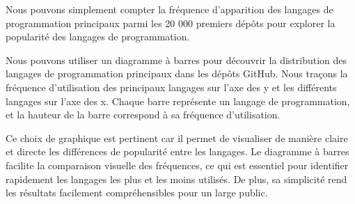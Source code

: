 \documentclass[
]{article}
\newenvironment{Shaded}{\begin{snugshade}}{\end{snugshade}}
\newcommand{\AttributeTok}[1]{\textcolor[rgb]{0.13,0.29,0.53}{#1}}
\newcommand{\DecValTok}[1]{\textcolor[rgb]{0.00,0.00,0.81}{#1}}
\newcommand{\FunctionTok}[1]{\textcolor[rgb]{0.13,0.29,0.53}{\textbf{#1}}}
\newcommand{\NormalTok}[1]{#1}
\newcommand{\OtherTok}[1]{\textcolor[rgb]{0.56,0.35,0.01}{#1}}
\newcommand{\SpecialCharTok}[1]{\textcolor[rgb]{0.81,0.36,0.00}{\textbf{#1}}}
\newcommand{\StringTok}[1]{\textcolor[rgb]{0.31,0.60,0.02}{#1}}
\begin{document}
Nous pouvons simplement compter la fréquence d'apparition des langages
de programmation principaux parmi les 20 000 premiers dépôts pour
explorer la popularité des langages de programmation.

Nous pouvons utiliser un diagramme à barres pour découvrir la
distribution des langages de programmation principaux dans les dépôts
GitHub. Nous traçons la fréquence d'utilisation des principaux langages
sur l'axe des y et les différents langages sur l'axe des x. Chaque barre
représente un langage de programmation, et la hauteur de la barre
correspond à sa fréquence d'utilisation.

Ce choix de graphique est pertinent car il permet de visualiser de
manière claire et directe les différences de popularité entre les
langages. Le diagramme à barres facilite la comparaison visuelle des
fréquences, ce qui est essentiel pour identifier rapidement les langages
les plus et les moins utilisés. De plus, sa simplicité rend les
résultats facilement compréhensibles pour un large public.

\begin{Shaded}
\end{Shaded}
\end{document}
